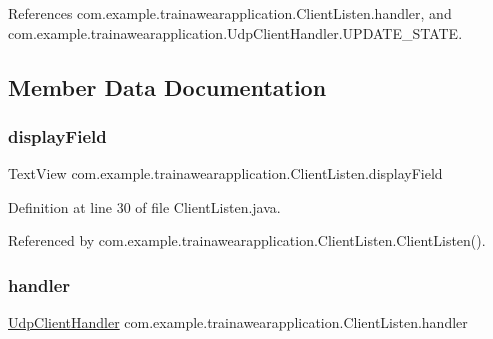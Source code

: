 References com.\+example.\+trainawearapplication.\+Client\+Listen.\+handler, and com.\+example.\+trainawearapplication.\+Udp\+Client\+Handler.\+U\+P\+D\+A\+T\+E\+\_\+\+S\+T\+A\+TE.



\subsection{Member Data Documentation}
\mbox{\label{classcom_1_1example_1_1trainawearapplication_1_1_client_listen_a832fe2d0515add95ba938249831116bc}} 
\subsubsection{\texorpdfstring{displayField}{displayField}}
{\footnotesize\ttfamily Text\+View com.\+example.\+trainawearapplication.\+Client\+Listen.\+display\+Field\hspace{0.3cm}{\ttfamily [private]}}



Definition at line 30 of file Client\+Listen.\+java.



Referenced by com.\+example.\+trainawearapplication.\+Client\+Listen.\+Client\+Listen().

\mbox{\label{classcom_1_1example_1_1trainawearapplication_1_1_client_listen_a6d6b6e018a0bc75068445635b2eacd26}} 
\subsubsection{\texorpdfstring{handler}{handler}}
{\footnotesize\ttfamily \mbox{\hyperlink{classcom_1_1example_1_1trainawearapplication_1_1_udp_client_handler}{Udp\+Client\+Handler}} com.\+example.\+trainawearapplication.\+Client\+Listen.\+handler\hspace{0.3cm}{\ttfamily [package]}}



